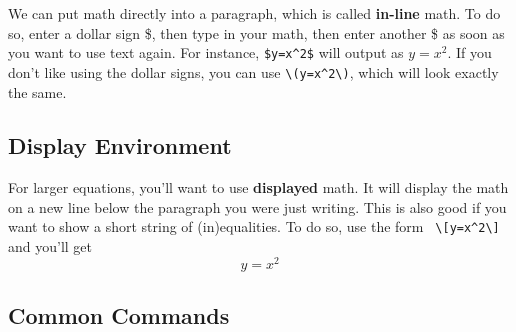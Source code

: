 \documentclass[12pt]{article}
\begin{document}
We can put math directly into a paragraph, which is called \textbf{in-line} math. To do so, enter a dollar sign \$, then type in your math, then enter another \$ as soon as you want to use text again. For instance, \verb|$y=x^2$|  will output as $y=x^2$. If you don't like using the dollar signs, you can use \verb|\(y=x^2\)|, which will look exactly the same.  


\subsection{Display Environment}

For larger equations, you'll want to use \textbf{displayed} math. It will display the math on a new line below the paragraph you were just writing. This is also good if you want to show a short string of (in)equalities.  To do so, use the form  \verb| \[y=x^2\]| and you'll get
		\[y=x^2\]


\subsection{Common Commands}
\end{document}
